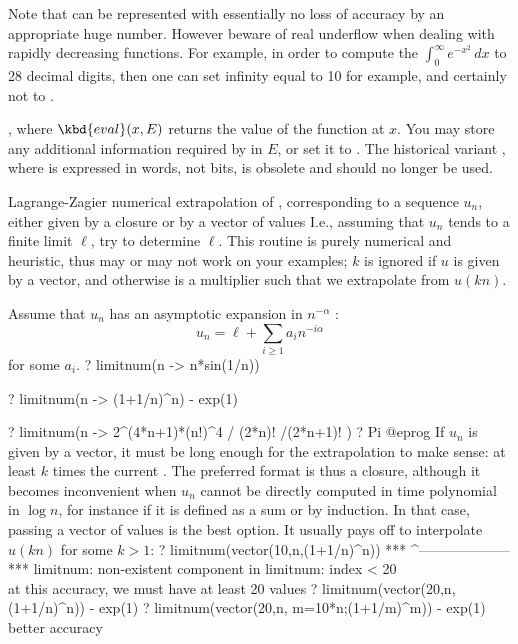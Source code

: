 Note that  can be represented with essentially no loss of
accuracy by an appropriate huge number. However beware of real underflow
when dealing with rapidly decreasing functions. For example, in order to
compute the $\int_0^\infty e^{-x^2}\,dx$ to 28 decimal digits, then one can
set infinity equal to 10 for example, and certainly not to .

,
where $\kbd{eval}(x, E)$ returns the value of the function at $x$.
You may store any additional information required by  in $E$, or set
it to . The historical variant
, where  is expressed in words,
not bits, is obsolete and should no longer be used.

\label{se:limitnum}
Lagrange-Zagier numerical extrapolation of , corresponding to a
sequence
$u_n$, either given by a closure  or by a vector of values
I.e., assuming that $u_n$ tends to a finite limit $\ell$, try to determine
$\ell$. This routine is purely numerical and heuristic, thus may or may not
work on your examples; $k$ is ignored if $u$ is given by a vector,
and otherwise is a multiplier such that we extrapolate from $u(kn)$.

Assume that $u_n$ has an asymptotic expansion in $n^{-\alpha}$ :
$$u_n = \ell + \sum_{i\geq 1} a_i n^{-i\alpha}$$
for some $a_i$.
\bprog
? limitnum(n -> n*sin(1/n))

? limitnum(n -> (1+1/n)^n) - exp(1)

? limitnum(n -> 2^(4*n+1)*(n!)^4 / (2*n)! /(2*n+1)! )
? Pi
@eprog\noindent
If $u_n$ is given by a vector, it must be long enough for the extrapolation
to make sense: at least $k$ times the current . The
preferred format is thus a closure, although it becomes inconvenient
when $u_n$ cannot be directly computed in time polynomial in $\log n$,
for instance if it is defined as a sum or by induction. In that case,
passing a vector of values is the best option. It usually pays off to
interpolate $u(kn)$ for some $k > 1$:
\bprog
? limitnum(vector(10,n,(1+1/n)^n))
 ***                 ^--------------------
 *** limitnum: non-existent component in limitnum: index < 20
\\ at this accuracy, we must have at least 20 values
? limitnum(vector(20,n,(1+1/n)^n)) - exp(1)
? limitnum(vector(20,n, m=10*n;(1+1/m)^m)) - exp(1) \\ better accuracy

